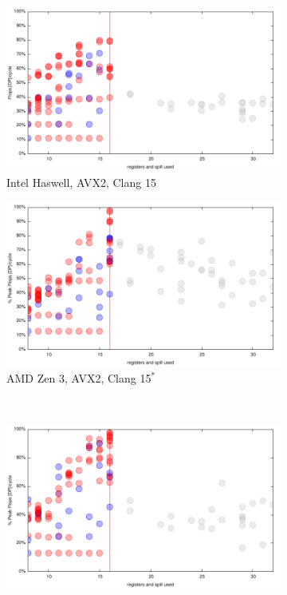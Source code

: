 \documentclass{article}
\begin{document}
\begin{figure}[h!]
  \begin{subfigure}[h!]{0.45\textwidth}
  \includegraphics[width=\textwidth]{../benches/gemm/haswell-64x256x64/greedy.pdf}
  \caption{Intel Haswell, AVX2, Clang 15}
  \end{subfigure}
  \begin{subfigure}[h!]{0.45\textwidth}  
\includegraphics[width=\textwidth]{../benches/gemm/zen3-64x256x64/greedy.pdf}
  \caption{AMD Zen 3, AVX2, Clang 15$^*$}
  \end{subfigure}\\
  \begin{subfigure}[h!]{0.45\textwidth}  
\includegraphics[width=\textwidth]{../benches/gemm/zen3-64x256x64/greedy-zen2.pdf}

\end{subfigure}
\end{figure}
\end{document}
